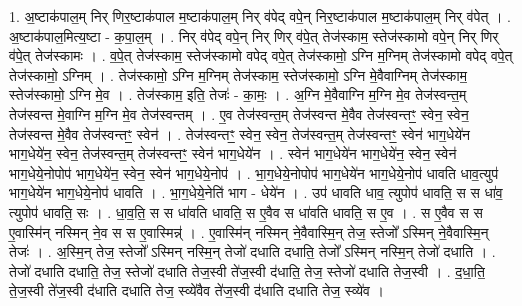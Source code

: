 \documentclass[17pt]{extarticle}
\begin{document}
1. अ॒ष्टाक॑पाल॒म् निर् णिर॒ष्टाक॑पाल म॒ष्टाक॑पाल॒म् निर् व॑पेद् वपे॒न् निर॒ष्टाक॑पाल म॒ष्टाक॑पाल॒म् निर् व॑पेत् । . अ॒ष्टाक॑पाल॒मित्य॒ष्टा - क॒पा॒ल॒म् । . निर् व॑पेद् वपे॒न् निर् णिर् व॑पे॒त् तेज॑स्काम॒ स्तेज॑स्कामो वपे॒न् निर् णिर् व॑पे॒त् तेज॑स्कामः । . व॒पे॒त् तेज॑स्काम॒ स्तेज॑स्कामो वपेद् वपे॒त् तेज॑स्कामो॒ ऽग्नि म॒ग्निम् तेज॑स्कामो वपेद् वपे॒त् तेज॑स्कामो॒ ऽग्निम् । . तेज॑स्कामो॒ ऽग्नि म॒ग्निम् तेज॑स्काम॒ स्तेज॑स्कामो॒ ऽग्नि मे॒वैवाग्निम् तेज॑स्काम॒ स्तेज॑स्कामो॒ ऽग्नि मे॒व । . तेज॑स्काम॒ इति॒ तेजः॑ - का॒मः॒ । . अ॒ग्नि मे॒वैवाग्नि म॒ग्नि मे॒व तेज॑स्वन्त॒म् तेज॑स्वन्त मे॒वाग्नि म॒ग्नि मे॒व तेज॑स्वन्तम् । . ए॒व तेज॑स्वन्त॒म् तेज॑स्वन्त मे॒वैव तेज॑स्वन्तꣳ॒॒ स्वेन॒ स्वेन॒ तेज॑स्वन्त मे॒वैव तेज॑स्वन्तꣳ॒॒ स्वेन॑ । . तेज॑स्वन्तꣳ॒॒ स्वेन॒ स्वेन॒ तेज॑स्वन्त॒म् तेज॑स्वन्तꣳ॒॒ स्वेन॑ भाग॒धेये॑न भाग॒धेये॑न॒ स्वेन॒ तेज॑स्वन्त॒म् तेज॑स्वन्तꣳ॒॒ स्वेन॑ भाग॒धेये॑न । . स्वेन॑ भाग॒धेये॑न भाग॒धेये॑न॒ स्वेन॒ स्वेन॑ भाग॒धेये॒नोपोप॑ भाग॒धेये॑न॒ स्वेन॒ स्वेन॑ भाग॒धेये॒नोप॑ । . भा॒ग॒धेये॒नोपोप॑ भाग॒धेये॑न भाग॒धेये॒नोप॑ धावति धाव॒त्युप॑ भाग॒धेये॑न भाग॒धेये॒नोप॑ धावति । . भा॒ग॒धेये॒नेति॑ भाग - धेये॑न । . उप॑ धावति धाव॒ त्युपोप॑ धावति॒ स स धा॑व॒ त्युपोप॑ धावति॒ सः । . धा॒व॒ति॒ स स धा॑वति धावति॒ स ए॒वैव स धा॑वति धावति॒ स ए॒व । . स ए॒वैव स स ए॒वास्मि॑न् नस्मिन् ने॒व स स ए॒वास्मिन्न्॑ । . ए॒वास्मि॑न् नस्मिन् ने॒वैवास्मि॒न् तेज॒ स्तेजो᳚ ऽस्मिन् ने॒वैवास्मि॒न् तेजः॑ । . अ॒स्मि॒न् तेज॒ स्तेजो᳚ ऽस्मिन् नस्मि॒न् तेजो॑ दधाति दधाति॒ तेजो᳚ ऽस्मिन् नस्मि॒न् तेजो॑ दधाति । . तेजो॑ दधाति दधाति॒ तेज॒ स्तेजो॑ दधाति तेज॒स्वी ते॑ज॒स्वी द॑धाति॒ तेज॒ स्तेजो॑ दधाति तेज॒स्वी । . द॒धा॒ति॒ ते॒ज॒स्वी ते॑ज॒स्वी द॑धाति दधाति तेज॒ स्व्ये॑वैव ते॑ज॒स्वी द॑धाति दधाति तेज॒ स्व्ये॑व । \newline
\end{document}
